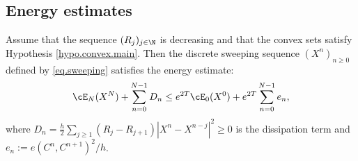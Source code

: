 \documentclass[]{jnsao}
\renewcommand{\tr}{R}
\begin{document}

 
 \subsection{Energy estimates}
 
\begin{proposition}\label{prop.nrj}
	Assume that the sequence $(\tr_j)_{j\in \N}$ is decreasing and that the convex sets satisfy
	Hypothesis \ref{hypo.convex.main}. 
	Then the discrete sweeping sequence $(X^n)_{n\ge0}$ defined by \eqref{eq.sweeping}	 
	satisfies the energy estimate:	
	\[
	\cE_{N}(X^{N}) +  \sum_{n=0}^{N-1} D_n \le e^{2 T} \cE_{0}(X^0) + e^{2 T} \sum_{n=0}^{N-1} e_n,
	\]
	where $D_n= \frac{h}{2} \sum_{j\ge1} (\tr_{j}-\tr_{j+1}) | X^{n} - X^{n-j}|^2 \geq 0$ is the dissipation term and
	$e_n:= e(C^n,C^{n+1})^2/h$.
\end{proposition}
 
\end{document}
